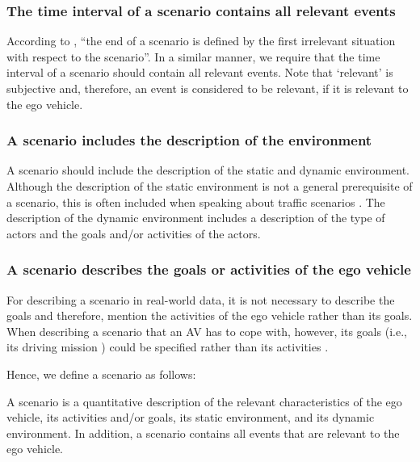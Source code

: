 \subsubsection{The time interval of a scenario contains all relevant events}
According to \textcite{geyer2014}, ``the end of a scenario is defined by the first irrelevant situation with respect to the scenario''. In a similar manner, we require that the time interval of a scenario should contain all relevant events. Note that `relevant' is subjective and, therefore, an event is considered to be relevant, if it is relevant to the ego vehicle.

\subsubsection{A scenario includes the description of the environment}
A scenario should include the description of the static and dynamic environment.
Although the description of the static environment is not a general prerequisite of a scenario, this is often included when speaking about traffic scenarios \cite{geyer2014, ulbrich2015, elrofai2016scenario, ebner2011identifying, schuldt2013effiziente, althoff2017CommonRoad}.
\cbstartc
The description of the dynamic environment includes a description of the type of actors and the goals and/or activities of the actors.
\cbend

\cbstartc
\subsubsection{A scenario describes the goals or activities of the ego vehicle}
For describing a scenario in real-world data, it is not necessary to describe the goals and therefore, \textcite{elrofai2016scenario} mention the activities of the ego vehicle rather than its goals. When describing a scenario that an AV has to cope with, however, its goals (i.e., its driving mission \cite{geyer2014}) could be specified rather than its activities \cite{ulbrich2015}. 
\cbend

Hence, we define a scenario as follows:
\begin{definition}[Scenario]\label{def:scenario}
	A scenario is a quantitative description of the relevant characteristics of the ego vehicle, its activities and/or goals, its static environment, and its dynamic environment. In addition, a scenario contains all events that are relevant to the ego vehicle.
\end{definition}


